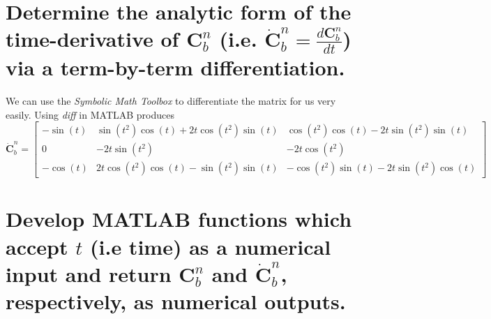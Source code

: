 \documentclass[12pt,letterpaper, onecolumn]{exam}
\begin{document}
\begin{questions}
\begin{parts}
    \end{parts}
    \clearpage
    \begin{parts}
        \part{Determine the analytic form of the time-derivative of $\mathbf{C}^n_b$ (i.e. $\dot{\mathbf{C}}^n_b = \frac{d\mathbf{C}^n_b}{dt}$) via a term-by-term differentiation.}

        We can use the \textit{Symbolic Math Toolbox} to differentiate the matrix for us very easily. Using \textit{diff} in MATLAB produces
        \[ \dot{\mathbf{C}}^n_b = \left[\begin{array}{ccc} -\sin\left(t\right) & \sin\left(t^2\right)\cos\left(t\right)+2t\cos\left(t^2\right)\sin\left(t\right) & \cos\left(t^2\right)\cos\left(t\right)-2t\sin\left(t^2\right)\sin\left(t\right)\\ 0 & -2t\sin\left(t^2\right) & -2t\cos\left(t^2\right)\\ -\cos\left(t\right) & 2t\cos\left(t^2\right)\cos\left(t\right)-\sin\left(t^2\right)\sin\left(t\right) & -\cos\left(t^2\right)\sin\left(t\right)-2t\sin\left(t^2\right)\cos\left(t\right) \end{array}\right]\]



        \part{Develop MATLAB functions which accept $t$ (i.e time) as a numerical input and return $\mathbf{C}^n_b$ and $\dot{\mathbf{C}}^n_b$, respectively, as numerical outputs.}



\end{parts}
\end{questions}
\end{document}
